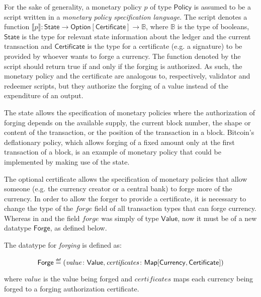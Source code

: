 \documentclass{llncs}
\newcommand{\defeq}{\mathrel{\overset{\makebox[0pt]{\mbox{\normalfont\tiny\sffamily def}}}{=}}}
\newcommand{\type}[1]{\mathsf{#1}}
\newcommand{\mapT}{\type{Map}}
\newcommand{\maybeT}{\type{Option}}
\newcommand{\valueT}{\type{Value}}
\newcommand{\currencyT}{\type{Currency}}
\newcommand{\stateT}{\type{State}}
\newcommand{\policyT}{\type{Policy}}
\newcommand{\certificateT}{\type{Certificate}}
\newcommand{\forgeT}{\type{Forge}}
\newcommand{\field}[1]{\mathit{#1}}
\newcommand{\forge}{\field{forge}}
\newcommand{\val}{\field{value}}
\newcommand{\certificates}{\field{certificates}}
\newcommand{\interpret}[1]{\llbracket #1 \rrbracket}
\newenvironment{smallish}{
	\begin{small}
}{
	\end{small}
}
\begin{document}
For the sake of generality, a monetary policy $p$ of type $\policyT$ is assumed to be a script written in a \emph{monetary policy specification language}. The script denotes a function $\interpret{p}\colon \stateT \rightarrow \maybeT[\certificateT] \rightarrow \mathbb{B}$, where $\mathbb{B}$ is the type of booleans, $\stateT$ is the type for relevant state information about the ledger and the current transaction and $\certificateT$ is the type for a certificate (e.g. a signature) to be provided by whoever wants to forge a currency. The function denoted by the script should return true if and only if the forging is authorized. As such, the monetary policy and the certificate are analogous to, respectively, validator and redeemer scripts, but they authorize the forging of a value instead of the expenditure of an output.

The state allows the specification of monetary policies where the authorization of forging depends on the available supply, the current block number, the shape or content of the transaction, or the position of the transaction in a block. Bitcoin's deflationary policy, which allows forging of a fixed amount only at the first transaction of a block, is an example of monetary policy that could be implemented by making use of the state.

The optional certificate allows the specification of monetary policies that allow someone (e.g. the currency creator or a central bank) to forge more of the currency. In order to allow the forger to provide a certificate, it is necessary to change the type of the $\forge$ field of all transaction types that can forge currency. Whereas in \cite{ChimericLedgers} and \cite{UTxOScripts} the field $\forge$ was simply of type $\valueT$, now it must be of a new datatype $\forgeT$, as defined below.


\begin{definition}
\label{def:Forge}
The datatype for \emph{forging} is defined as:
\begin{smallish}
\begin{equation*}
\forgeT \defeq (\val\colon \valueT, \certificates\colon \mapT[\currencyT, \certificateT])
\end{equation*}
\end{smallish}
where $\val$ is the value being forged and $\certificates$ maps each currency being forged to a forging authorization certificate.
\end{definition}
\end{document}

